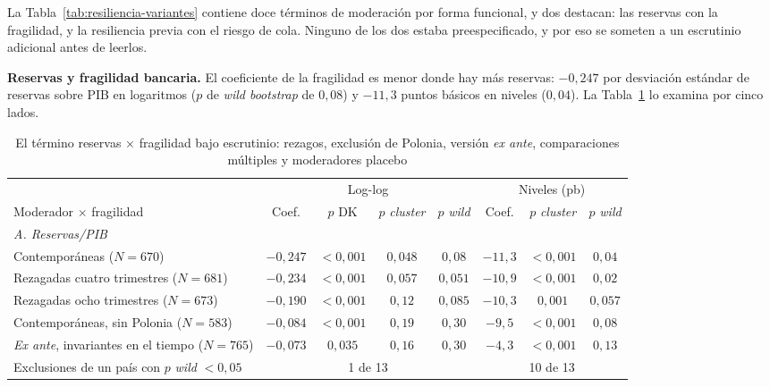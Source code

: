 La Tabla~\ref{tab:resiliencia-variantes} contiene doce términos de moderación por forma funcional, y dos destacan: las reservas con la fragilidad, y la resiliencia previa con el riesgo de cola. Ninguno de los dos estaba preespecificado, y por eso se someten a un escrutinio adicional antes de leerlos.

\textbf{Reservas y fragilidad bancaria.} El coeficiente de la fragilidad es menor donde hay más reservas: $-0{,}247$ por desviación estándar de reservas sobre PIB en logaritmos ($p$ de \textit{wild bootstrap} de $0{,}08$) y $-11{,}3$ puntos básicos en niveles ($0{,}04$). La Tabla~\ref{tab:reservas} lo examina por cinco lados.

\begin{table}[htbp]
\centering
\small
\caption[Reservas y fragilidad bancaria bajo escrutinio]{El término reservas $\times$ fragilidad bajo escrutinio: rezagos, exclusión de Polonia, versión \textit{ex ante}, comparaciones múltiples y moderadores placebo}
\label{tab:reservas}
\begin{adjustbox}{max width=\linewidth}
\begin{tabular}{l cccc ccc}
\toprule
 & \multicolumn{4}{c}{Log-log} & \multicolumn{3}{c}{Niveles (pb)} \\
\cmidrule(lr){2-5}\cmidrule(lr){6-8}
Moderador $\times$ fragilidad & Coef. & $p$ DK & $p$ \textit{cluster} & $p$ \textit{wild} & Coef. & $p$ \textit{cluster} & $p$ \textit{wild} \\
\midrule
\multicolumn{8}{l}{\textit{A. Reservas/PIB}} \\
\quad Contemporáneas ($N=670$) & $-0{,}247$ & $<0{,}001$ & $0{,}048$ & $0{,}08$ & $-11{,}3$ & $<0{,}001$ & $0{,}04$ \\
\quad Rezagadas cuatro trimestres ($N=681$) & $-0{,}234$ & $<0{,}001$ & $0{,}057$ & $0{,}051$ & $-10{,}9$ & $<0{,}001$ & $0{,}02$ \\
\quad Rezagadas ocho trimestres ($N=673$) & $-0{,}190$ & $<0{,}001$ & $0{,}12$ & $0{,}085$ & $-10{,}3$ & $0{,}001$ & $0{,}057$ \\
\quad Contemporáneas, sin Polonia ($N=583$) & $-0{,}084$ & $<0{,}001$ & $0{,}19$ & $0{,}30$ & $-9{,}5$ & $<0{,}001$ & $0{,}08$ \\
\quad \textit{Ex ante}, invariantes en el tiempo ($N=765$) & $-0{,}073$ & $0{,}035$ & $0{,}16$ & $0{,}30$ & $-4{,}3$ & $<0{,}001$ & $0{,}13$ \\
\quad Exclusiones de un país con $p$ \textit{wild} $<0{,}05$ & \multicolumn{4}{c}{1 de 13} & \multicolumn{3}{c}{10 de 13} \\

\end{tabular}
\end{adjustbox}
\end{table}

